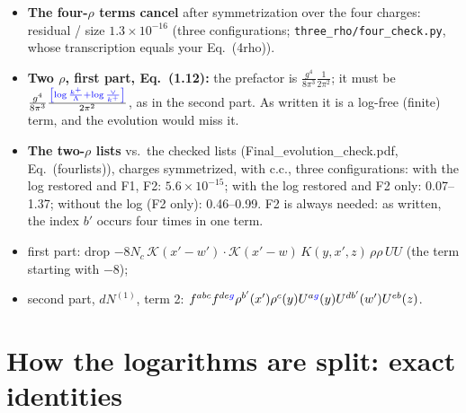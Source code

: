 \documentclass[10pt]{article}
\numberwithin{equation}{section}
\newcommand{\new}[1]{{\color{blue}#1}}
\newcommand{\old}[1]{{\color{red}#1}}
\begin{document}
\begin{itemize}
\item \textbf{The four-$\rho$ terms cancel} after symmetrization over the four charges: residual / size $1.3\times10^{-16}$ (three configurations; \texttt{three\_rho/four\_check.py}, whose transcription equals your Eq.~(4rho)).
\item \textbf{Two $\rho$, first part, Eq.~(1.12):} the prefactor is $\frac{g^4}{8\pi^3}\frac{1}{2\pi^2}$; it must be $\frac{g^4}{8\pi^3}\frac{\new{\left[\log\frac{k^+}{\Lambda}+\log\frac{\vee}{k^+}\right]}}{2\pi^2}$, as in the second part. As written it is a log-free (finite) term, and the evolution would miss it.
\item \textbf{The two-$\rho$ lists} vs.\ the checked lists (Final\_evolution\_check.pdf, Eq.~(fourlists)), charges symmetrized, with c.c., three configurations: with the log restored and F1, F2: $5.6\times10^{-15}$; with the log restored and F2 only: 0.07--1.37; without the log (F2 only): 0.46--0.99. F2 is always needed: as written, the index $b'$ occurs four times in one term.
\item[F1] first part: drop \old{$-8N_c\,\mathcal K(x'-w')\cdot\mathcal K(x'-w)\,K(y,x',z)\,\rho\rho\,UU$} (the term starting with $-8$);
\item[F2] second part, $dN^{(1)}$, term 2: $f^{abc}f^{de\new{g}}\rho^{b'}(x')\rho^{c}(y)U^{a\new{g}}(y)U^{db'}(w')U^{eb}(z)$.
\end{itemize}

\section{How the logarithms are split: exact identities}\label{sec:logs}
\end{document}

